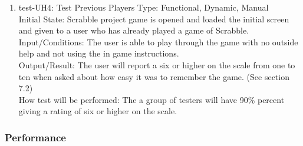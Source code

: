 \documentclass[12pt, titlepage]{article}
\begin{document}
\begin{enumerate}
    \item{test-UH4: Test Previous Players}
    Type: Functional, Dynamic, Manual\\
    Initial State: Scrabble project game is opened and loaded the initial screen and given to a user who has already played a game of Scrabble.\\
    Input/Conditions: The user is able to play through the game with no outside help and not using the in game instructions.\\
    Output/Result:  The user will report a six or higher on the scale from one to ten when asked about how easy it was to remember the game. (See section 7.2)\\
    How test will be performed: The a group of testers will have 90\% percent giving a rating of six or higher on the scale.\\
\end{enumerate}

\subsubsection{Performance}
\end{document}
